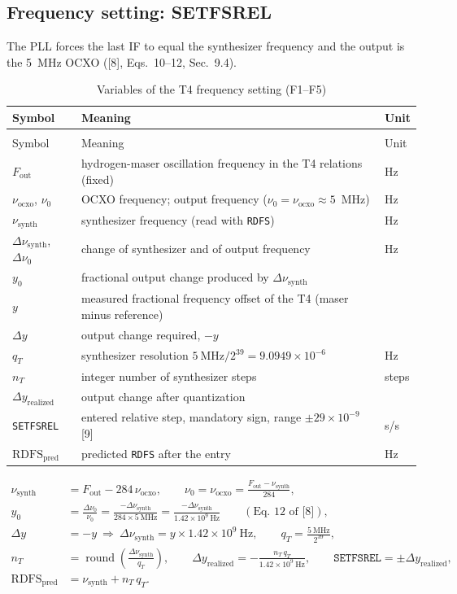 \documentclass[11pt,a4paper]{article}
\makeatletter
\newcommand{\tfourman}{[8]}
\newcommand{\tfournet}{[9]}
\renewcommand{\_}{\usscore\allowbreak}
\newenvironment{vartable}[2]{%
 \par\small\setlength{\LTpre}{3pt}\setlength{\LTpost}{3pt}%
 \begin{longtable}{@{}>{\raggedright}p{.2\linewidth}>{\raggedright}p{.57\linewidth}>{\raggedright\arraybackslash}p{.17\linewidth}@{}}
 \caption{#2}\label{#1}\\
 \toprule Symbol & Meaning & Unit\\\midrule
 \endfirsthead
 \multicolumn{3}{@{}l}{\footnotesize\itshape Table \thetable{} (continued)}\\
 \toprule Symbol & Meaning & Unit\\\midrule
 \endhead
 \bottomrule
 \endlastfoot}
 {\end{longtable}\normalsize}
\makeatother
\begin{document}
\subsection{Frequency setting: SETFSREL}\label{sec:setfsrel}
The PLL forces the last IF to equal the synthesizer frequency and the output is the 5~MHz OCXO
(\tfourman, Eqs.~10--12, Sec.~9.4).
\begin{vartable}{tab:var-F}{Variables of the T4 frequency setting (F1--F5)}
\(F_{\mathrm{out}}\) & hydrogen-maser oscillation frequency in the T4 relations (fixed) & Hz\\
\(\nu_{\mathrm{ocxo}}\), \(\nu_0\) & OCXO frequency; output frequency (\(\nu_0=\nu_{\mathrm{ocxo}}\approx5\)~MHz) & Hz\\
\(\nu_{\mathrm{synth}}\) & synthesizer frequency (read with \texttt{RDFS}) & Hz\\
\(\Delta\nu_{\mathrm{synth}}\), \(\Delta\nu_0\) & change of synthesizer and of output frequency & Hz\\
\(y_0\) & fractional output change produced by \(\Delta\nu_{\mathrm{synth}}\) & 1\\
\(y\) & measured fractional frequency offset of the T4 (maser minus reference) & 1\\
\(\Delta y\) & output change required, \(-y\) & 1\\
\(q_T\) & synthesizer resolution \(5\ \mathrm{MHz}/2^{39}=9.0949\times10^{-6}\) & Hz\\
\(n_T\) & integer number of synthesizer steps & steps\\
\(\Delta y_{\mathrm{realized}}\) & output change after quantization & 1\\
\texttt{SETFSREL} & entered relative step, mandatory sign, range \(\pm29\times10^{-9}\) \tfournet & s/s\\
\(\mathrm{RDFS}_{\mathrm{pred}}\) & predicted \texttt{RDFS} after the entry & Hz\\
\end{vartable}
\begin{align}
\nu_{\mathrm{synth}}&=F_{\mathrm{out}}-284\,\nu_{\mathrm{ocxo}},\qquad
\nu_0=\nu_{\mathrm{ocxo}}=\frac{F_{\mathrm{out}}-\nu_{\mathrm{synth}}}{284}, \tag{F1}\label{eq:F1}\\
y_0&=\frac{\Delta\nu_0}{\nu_0}=\frac{-\Delta\nu_{\mathrm{synth}}}{284\times5\ \mathrm{MHz}}
=\frac{-\Delta\nu_{\mathrm{synth}}}{1.42\times10^{9}\ \mathrm{Hz}}\qquad(\text{Eq.~12 of \tfourman}), \tag{F2}\label{eq:F2}\\
\Delta y&=-y\ \Rightarrow\ \Delta\nu_{\mathrm{synth}}=y\times1.42\times10^{9}\ \mathrm{Hz},
\qquad q_T=\frac{5\ \mathrm{MHz}}{2^{39}}, \tag{F3}\label{eq:F3}\\
n_T&=\operatorname{round}\!\left(\frac{\Delta\nu_{\mathrm{synth}}}{q_T}\right),\qquad
\Delta y_{\mathrm{realized}}=-\frac{n_T\,q_T}{1.42\times10^{9}\ \mathrm{Hz}},\qquad
\texttt{SETFSREL}=\pm\Delta y_{\mathrm{realized}}, \tag{F4}\label{eq:F4}\\
\mathrm{RDFS}_{\mathrm{pred}}&=\nu_{\mathrm{synth}}+n_T\,q_T . \tag{F5}\label{eq:F5}
\end{align}
\end{document}
